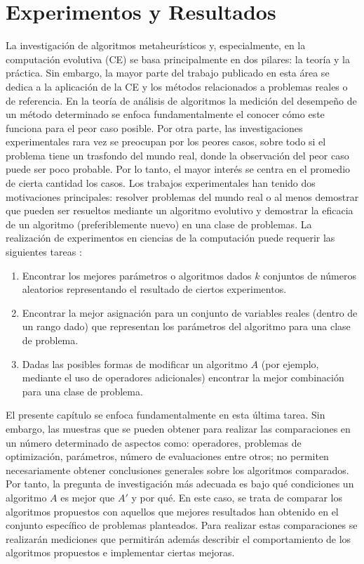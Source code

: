 \chapter{Experimentos y Resultados} \label{Chapter7}

La investigación de algoritmos metaheurísticos y, especialmente, en la computación evolutiva (CE) se basa principalmente en dos pilares: la teoría y la práctica. Sin embargo, la mayor parte del trabajo publicado en esta área se dedica a la aplicación de la CE y los métodos relacionados a problemas reales o de referencia. En la teoría de análisis de algoritmos la medición del desempeño de un método determinado se enfoca fundamentalmente el conocer cómo este funciona para el peor caso posible. Por otra parte, las investigaciones experimentales rara vez se preocupan por los peores casos, sobre todo si el problema tiene un trasfondo del mundo real, donde la observación del peor caso puede ser poco probable. Por lo tanto, el mayor interés se centra en el promedio de cierta cantidad los casos. Los trabajos experimentales han tenido dos motivaciones principales: resolver problemas del mundo real o al menos demostrar que pueden ser resueltos mediante un algoritmo evolutivo y demostrar la eficacia de un algoritmo (preferiblemente nuevo) en una clase de problemas. La realización de experimentos en ciencias de la computación puede requerir las siguientes tareas \cite{BartzBeielstein2014ExperimentalAO}:
\begin{enumerate}
	\item Encontrar los mejores parámetros o algoritmos dados $k$ conjuntos de números aleatorios representando el resultado de ciertos experimentos.
	\item  Encontrar la mejor asignación para un conjunto de variables reales (dentro de un rango dado) que representan los parámetros del algoritmo para una clase de problema.
	\item Dadas las posibles formas de modificar un algoritmo $A$ (por ejemplo, mediante el uso de operadores adicionales) encontrar la mejor combinación para una clase de problema.
\end{enumerate}
El presente capítulo se enfoca fundamentalmente en esta última tarea. Sin embargo, las muestras que se pueden obtener para realizar las comparaciones en un número determinado de aspectos como: operadores, problemas de optimización, parámetros, número de evaluaciones entre otros; no permiten necesariamente obtener conclusiones generales sobre los algoritmos comparados. Por tanto, la pregunta de investigación más adecuada es bajo qué condiciones  un algoritmo $A$ es mejor que $A'$ y por qué. En este caso, se trata de comparar los algoritmos propuestos con aquellos que mejores resultados han obtenido en el conjunto específico de problemas planteados. Para realizar estas comparaciones se realizarán mediciones que permitirán además describir el comportamiento de los algoritmos propuestos e implementar ciertas mejoras.
